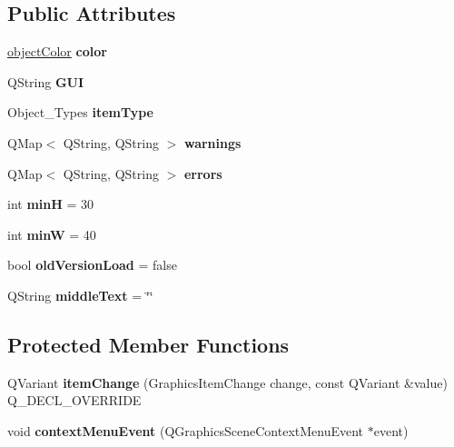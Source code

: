 \subsection*{Public Attributes}
\begin{DoxyCompactItemize}
\item 
\mbox{\label{classwizard_item_a55a4915610eae0da15f618f1f73d9ab1}} 
\hyperlink{structobject_color}{object\+Color} {\bfseries color}
\item 
\mbox{\label{classwizard_item_a3258844417d4a8f79280c761b028c724}} 
Q\+String {\bfseries G\+UI}
\item 
\mbox{\label{classwizard_item_a64e088263356070a9c958b325c5bcd18}} 
Object\+\_\+\+Types {\bfseries item\+Type}
\item 
\mbox{\label{classwizard_item_adbcae14cd7fc7a23feb8e554d7ae728b}} 
Q\+Map$<$ Q\+String, Q\+String $>$ {\bfseries warnings}
\item 
\mbox{\label{classwizard_item_a10437b177b2cc9887640c2735fc55f60}} 
Q\+Map$<$ Q\+String, Q\+String $>$ {\bfseries errors}
\item 
\mbox{\label{classwizard_item_a040953aa77fbce724e7e057e742aa8c6}} 
int {\bfseries minH} = 30
\item 
\mbox{\label{classwizard_item_af3d60d484ec04975b574563db0f35dbf}} 
int {\bfseries minW} = 40
\item 
\mbox{\label{classwizard_item_aa250ab21e058cc7ee867764d2dfca97a}} 
bool {\bfseries old\+Version\+Load} = false
\item 
\mbox{\label{classwizard_item_a6b5df4170501388bd2f2ebbe4e96128c}} 
Q\+String {\bfseries middle\+Text} = \char`\"{}\char`\"{}
\end{DoxyCompactItemize}
\subsection*{Protected Member Functions}
\begin{DoxyCompactItemize}
\item 
\mbox{\label{classwizard_item_a4c92b0e9522bcd22524ffe97b3cf8a46}} 
Q\+Variant {\bfseries item\+Change} (Graphics\+Item\+Change change, const Q\+Variant \&value) Q\+\_\+\+D\+E\+C\+L\+\_\+\+O\+V\+E\+R\+R\+I\+DE
\item 
\mbox{\label{classwizard_item_a324acaad3ad0524c17ed8d2463e8e55a}} 
void {\bfseries context\+Menu\+Event} (Q\+Graphics\+Scene\+Context\+Menu\+Event $\ast$event)
\end{DoxyCompactItemize}


